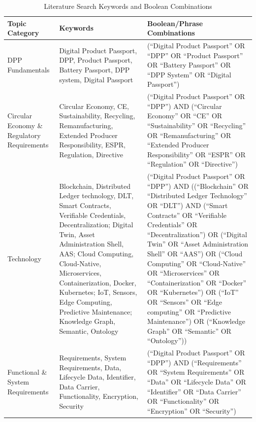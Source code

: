 \begin{table}[htbp]
  \centering
  \smaller
  \caption{Literature Search Keywords and Boolean Combinations}
  \renewcommand{\arraystretch}{1.2}
    \begin{tabularx}{\textwidth}{|
      >{\arraybackslash}X|
      >{\arraybackslash}X|
      >{\arraybackslash}X|}
      \hline
      \rowcolor{myDarkBlue}\color{white}\textbf{Topic Category} & \color{white}\textbf{Keywords} & \color{white}\textbf{Boolean/Phrase Combinations} \\
      \hline
      DPP Fundamentals & 
        Digital Product Passport, DPP, Product Passport, Battery Passport, DPP system, Digital Passport & 
        (``Digital Product Passport'' OR ``DPP'' OR ``Product Passport'' OR ``Battery Passport'' OR ``DPP System'' OR ``Digital Passport'') \\
      \hline
      Circular Economy \& Regulatory Requirements & 
        Circular Economy, CE, Sustainability, Recycling, Remanufacturing, Extended Producer Responsibility, ESPR, Regulation, Directive & 
        (``Digital Product Passport'' OR ``DPP'') AND (``Circular Economy'' OR ``CE'' OR ``Sustainability'' OR ``Recycling'' OR ``Remanufacturing'' OR ``Extended Producer Responsibility'' OR ``ESPR'' OR ``Regulation'' OR ``Directive'') \\
      \hline
      Technology & 
        Blockchain, Distributed Ledger technology, DLT, Smart Contracts, Verifiable Credentials, Decentralization;
        Digital Twin, Asset Administration Shell, AAS;
        Cloud Computing, Cloud-Native, Microservices, Containerization, Docker, Kubernetes;
        IoT, Sensors, Edge Computing, Predictive Maintenance; Knowledge Graph, Semantic, Ontology & 
        (``Digital Product Passport'' OR ``DPP'') AND ((``Blockchain'' OR ``Distributed Ledger Technology'' OR ``DLT'') AND (``Smart Contracts'' OR ``Verifiable Credentials'' OR ``Decentralization'') OR (``Digital Twin'' OR ``Asset Administration Shell'' OR ``AAS'') OR (``Cloud Computing'' OR ``Cloud-Native'' OR ``Microservices'' OR ``Containerization'' OR ``Docker'' OR ``Kubernetes'') OR (``IoT'' OR ``Sensors'' OR ``Edge computing'' OR ``Predictive Maintenance'') OR (``Knowledge Graph'' OR ``Semantic'' OR ``Ontology'')) \\
      \hline
      Functional \& System Requirements & 
        Requirements, System Requirements, Data, Lifecycle Data, Identifier, Data Carrier, Functionality, Encryption, Security & 
        (``Digital Product Passport'' OR ``DPP'') AND (``Requirements'' OR ``System Requirements'' OR ``Data'' OR ``Lifecycle Data'' OR ``Identifier'' OR ``Data Carrier'' OR ``Functionality'' OR ``Encryption'' OR ``Security'') \\

\end{tabularx}
\end{table}
